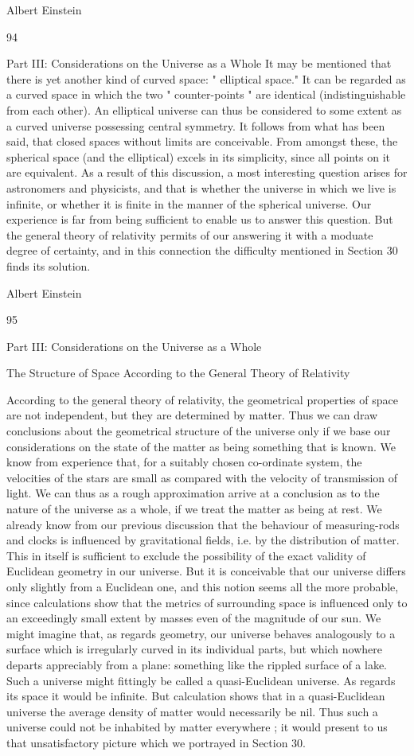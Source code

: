 \documentclass{article}
\begin{document}
Albert Einstein

94

Part III: Considerations on the Universe as a Whole
It may be mentioned that there is yet another kind of curved space: " elliptical space." It
can be regarded as a curved space in which the two " counter-points " are identical
(indistinguishable from each other). An elliptical universe can thus be considered to some
extent as a curved universe possessing central symmetry.
It follows from what has been said, that closed spaces without limits are conceivable.
From amongst these, the spherical space (and the elliptical) excels in its simplicity, since all
points on it are equivalent. As a result of this discussion, a most interesting question arises
for astronomers and physicists, and that is whether the universe in which we live is infinite,
or whether it is finite in the manner of the spherical universe. Our experience is far from
being sufficient to enable us to answer this question. But the general theory of relativity
permits of our answering it with a moduate degree of certainty, and in this connection the
difficulty mentioned in Section 30 finds its solution.

Albert Einstein

95

Part III: Considerations on the Universe as a Whole

The Structure of Space According
to the General Theory of
Relativity

According to the general theory of relativity, the geometrical properties of space are not
independent, but they are determined by matter. Thus we can draw conclusions about the
geometrical structure of the universe only if we base our considerations on the state of the
matter as being something that is known. We know from experience that, for a suitably
chosen co-ordinate system, the velocities of the stars are small as compared with the
velocity of transmission of light. We can thus as a rough approximation arrive at a
conclusion as to the nature of the universe as a whole, if we treat the matter as being at rest.
We already know from our previous discussion that the behaviour of measuring-rods and
clocks is influenced by gravitational fields, i.e. by the distribution of matter. This in itself is
sufficient to exclude the possibility of the exact validity of Euclidean geometry in our
universe. But it is conceivable that our universe differs only slightly from a Euclidean one,
and this notion seems all the more probable, since calculations show that the metrics of
surrounding space is influenced only to an exceedingly small extent by masses even of the
magnitude of our sun. We might imagine that, as regards geometry, our universe behaves
analogously to a surface which is irregularly curved in its individual parts, but which
nowhere departs appreciably from a plane: something like the rippled surface of a lake.
Such a universe might fittingly be called a quasi-Euclidean universe. As regards its space it
would be infinite. But calculation shows that in a quasi-Euclidean universe the average
density of matter would necessarily be nil. Thus such a universe could not be inhabited by
matter everywhere ; it would present to us that unsatisfactory picture which we portrayed in
Section 30.
\end{document}
